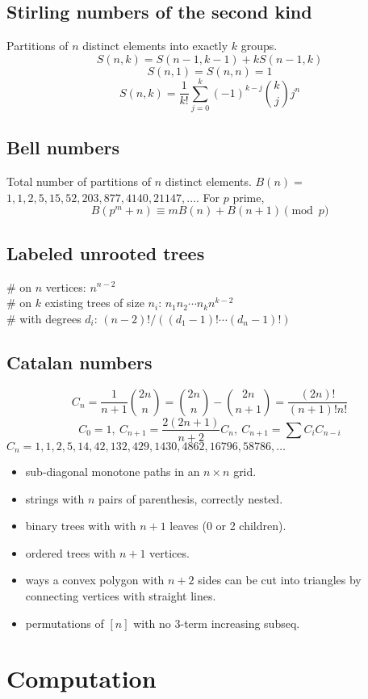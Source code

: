 	\subsection{Stirling numbers of the second kind}
		Partitions of $n$ distinct elements into exactly $k$ groups.
		$$S(n,k) = S(n-1,k-1) + k S(n-1,k)$$
		$$S(n,1) = S(n,n) = 1$$
		$$S(n,k) = \frac{1}{k!}\sum_{j=0}^k (-1)^{k-j}\binom{k}{j}j^n$$

	\subsection{Bell numbers}
		Total number of partitions of $n$ distinct elements. $B(n) =$
		$1, 1, 2, 5, 15, 52, 203, 877, 4140, 21147, \dots$. For $p$ prime,
		\[ B(p^m+n)\equiv mB(n)+B(n+1) \pmod{p} \]

	\subsection{Labeled unrooted trees}
		\# on $n$ vertices: $n^{n-2}$ \\
		\# on $k$ existing trees of size $n_i$: $n_1n_2\cdots n_k n^{k-2}$ \\
		\# with degrees $d_i$: $(n-2)! / ((d_1-1)! \cdots (d_n-1)!)$

	\subsection{Catalan numbers}
		\[ C_n=\frac{1}{n+1}\binom{2n}{n}= \binom{2n}{n}-\binom{2n}{n+1} = \frac{(2n)!}{(n+1)!n!} \]
		\[ C_0=1,\ C_{n+1} = \frac{2(2n+1)}{n+2}C_n,\ C_{n+1}=\sum C_iC_{n-i} \]
		${C_n = 1, 1, 2, 5, 14, 42, 132, 429, 1430, 4862, 16796, 58786, \dots}$
		\begin{itemize}[noitemsep]
			\item sub-diagonal monotone paths in an $n\times n$ grid.
			\item strings with $n$ pairs of parenthesis, correctly nested.
			\item binary trees with with $n+1$ leaves (0 or 2 children).
			\item ordered trees with $n+1$ vertices.
			\item ways a convex polygon with $n+2$ sides can be cut into triangles by connecting vertices with straight lines.
			\item permutations of $[n]$ with no 3-term increasing subseq.
		\end{itemize}

\section{Computation}
